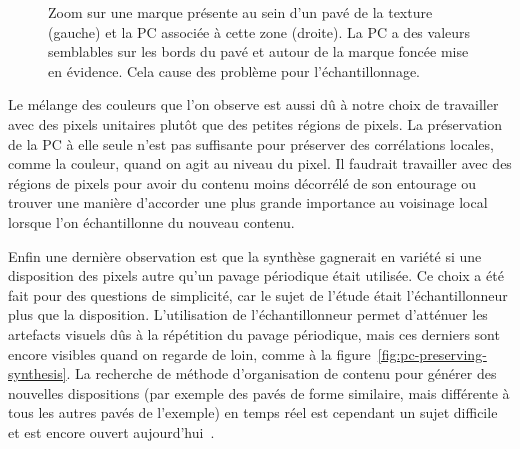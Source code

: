 \begin{figure}
\begin{subfigure}{.45\textwidth}
    \end{subfigure}

    \caption[Problème d'échantillonnage dû à la présence de marques au sein des pavés de la texture]{Zoom sur une marque présente au sein d'un pavé de la texture (gauche) et la PC associée à cette zone (droite). La PC a des valeurs semblables sur les bords du pavé et autour de la marque foncée mise en évidence. Cela cause des problème pour l'échantillonnage.}
    \label{fig:pc-defect}
\end{figure}

Le mélange des couleurs que l'on observe est aussi dû à notre choix de travailler avec des pixels unitaires plutôt que des petites régions de pixels. La préservation de la PC à elle seule n'est pas suffisante pour préserver des corrélations locales, comme la couleur, quand on agit au niveau du pixel. Il faudrait travailler avec des régions de pixels pour avoir du contenu moins décorrélé de son entourage ou trouver une manière d'accorder une plus grande importance au voisinage local lorsque l'on échantillonne du nouveau contenu.

\bigskip

Enfin une dernière observation est que la synthèse gagnerait en variété si une disposition des pixels autre qu'un pavage périodique était utilisée. Ce choix a été fait pour des questions de simplicité, car le sujet de l'étude était l'échantillonneur plus que la disposition. L'utilisation de l'échantillonneur permet d'atténuer les artefacts visuels dûs à la répétition du pavage périodique, mais ces derniers sont encore visibles quand on regarde de loin, comme à la figure~\ref{fig:pc-preserving-synthesis}. La recherche de méthode d'organisation de contenu pour générer des nouvelles dispositions (par exemple des pavés de forme similaire, mais différente à tous les autres pavés de l'exemple) en temps réel est cependant un sujet difficile et est encore ouvert aujourd'hui~\cite{guehl_semi-procedural_2020, baldi_differentiable_2023}.